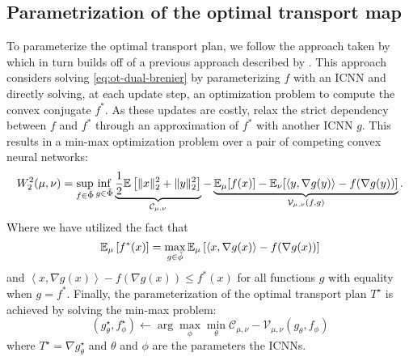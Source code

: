 \subsection{Parametrization of the optimal transport map}
To parameterize the optimal transport plan, we follow the approach taken by \citeauthor{makkuva2020} which 
in turn builds off of a previous approach described by \citet{taghvaei2019}.
This approach considers solving \eqref{eq:ot-dual-brenier} by parameterizing $f$ with an ICNN and directly solving, at each update step, an optimization problem to compute the convex conjugate $f^*$.
As these updates are costly, \citet{makkuva2020} relax the strict dependency between $f$ and $f^*$
through an approximation of $f^*$ with another ICNN $g$.
This results in a min-max optimization problem over a pair of competing convex neural networks:
\begin{equation} \label{eq:ot-makkuva}
  W_{2}^2(\mu, \nu)=\sup _{\substack{f \in \Tilde{\Phi}}} \inf _{g \in \Tilde{\Phi}}  \underbrace{\frac{1}{2}\mathbb{E}\left[\|x\|_{2}^{2}+\|y\|_{2}^{2}\right]}_{\mathcal{C}_{\mu, \nu}} - \underbrace{\mathbb{E}_{\mu}[f(x)]-\mathbb{E}_{\nu}[\langle y, \nabla g(y)\rangle-f(\nabla g(y))]}_{\mathcal{V}_{\mu, \nu}(f, g)}.
\end{equation}
Where we have utilized the fact that
\begin{equation}
  \mathbb{E}_\mu \left[f^*(x)\right] = \max_{g \in \Tilde{\phi}} \mathbb{E}_\mu \left[ \left<x, \nabla g(x)\right> - f(\nabla g(x))\right]
  \label{eq:ot-makkuva-hint}
\end{equation}
and 
$\left<x, \nabla g(x)\right> - f(\nabla g(x)) \leq f^*(x)$ for all functions $g$ with equality when $g=f^*$.
Finally, the parameterization of the optimal transport plan $T^\star$ is achieved by solving the min-max problem:
\begin{equation}
  (g^\star_\theta, f^\star_\phi) \leftarrow \arg \max_\phi \min_\theta \mathcal{C}_{\mu,\nu} - \mathcal{V}_{\mu, \nu}(g_\theta, f_\phi)
  \label{eq:ot-makkuva-optim}
\end{equation}
where $T^\star = \nabla g^\star_\theta$ and $\theta$ and $\phi$ are the parameters the ICNNs.



